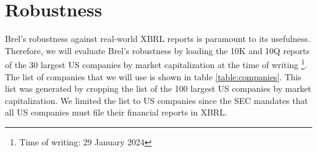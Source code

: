 \section{Robustness}
\label{sec:robustness}

Brel's robustness against real-world XBRL reports is paramount to its usefulness.
Therefore, we will evaluate Brel's robustness by loading the 10K and 10Q reports of the 30 largest US companies by market capitalization at the time of writing
\footnote{Time of writing: 29 January 2024}.
The list of companies that we will use is shown in table \ref{table:companies}.
This list was generated by cropping the list of the 100 largest US companies by market capitalization\cite{largest_us_companies}.
We limited the list to US companies since the SEC mandates that all US companies must file their financial reports in XBRL\cite{sec_ixbrl}.


